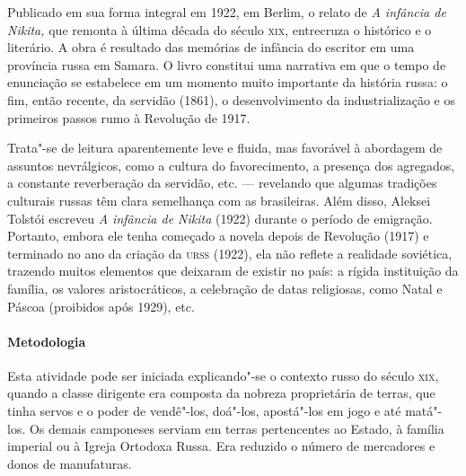 \documentclass{article}
\begin{document}
Publicado em sua forma integral em 1922, em Berlim, o relato de \emph{A
infância de Nikita,} que remonta à última década do século \textsc{xix},
entrecruza o histórico e o literário. A obra é resultado das memórias de
infância do escritor em uma província russa em Samara. O livro constitui
uma narrativa em que o tempo de enunciação se estabelece em um momento
muito importante da história russa: o fim, então recente, da servidão
(1861), o desenvolvimento da industrialização e os primeiros passos rumo
à Revolução de 1917.

Trata"-se de leitura aparentemente leve e fluida, mas favorável à
abordagem de assuntos nevrálgicos, como a cultura do favorecimento, a
presença dos agregados, a constante reverberação da servidão, etc. ---
revelando que algumas tradições culturais russas têm clara semelhança
com as brasileiras. Além disso, Aleksei Tolstói escreveu \emph{A
infância de Nikita} (1922) durante o período de emigração. Portanto,
embora ele tenha começado a novela depois de Revolução (1917) e
terminado no ano da criação da \textsc{urss} (1922), ela não reflete a realidade
soviética, trazendo muitos elementos que deixaram de existir no país: a
rígida instituição da família, os valores aristocráticos, a celebração
de datas religiosas, como Natal e Páscoa (proibidos após 1929), etc.

\paragraph{Metodologia}
Esta atividade pode ser iniciada explicando"-se o contexto russo do
século \textsc{xix}, quando a classe dirigente era composta da nobreza
proprietária de terras, que tinha servos e o poder de vendê"-los,
doá"-los, apostá"-los em jogo e até matá"-los. Os demais camponeses serviam
em terras pertencentes ao Estado, à família imperial ou à Igreja
Ortodoxa Russa. Era reduzido o número de mercadores e donos de
manufaturas.
\end{document}
